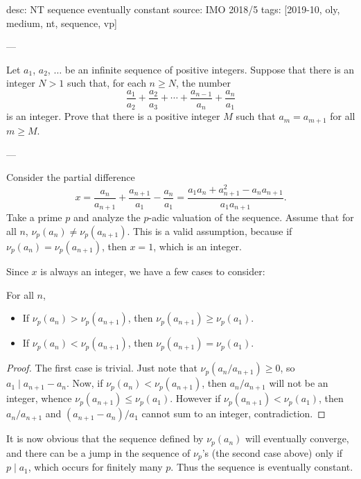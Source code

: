desc: NT sequence eventually constant
source: IMO 2018/5
tags: [2019-10, oly, medium, nt, sequence, vp]

---

Let $a_1$, $a_2$, $\ldots$ be an infinite sequence of positive integers. Suppose that there is an integer $N>1$ such that, for each $n\ge N$, the number \[\frac{a_1}{a_2}+\frac{a_2}{a_3}+\cdots+\frac{a_{n-1}}{a_n}+\frac{a_n}{a_1}\]
is an integer. Prove that there is a positive integer $M$ such that $a_m=a_{m+1}$ for all $m\ge M$.

---

Consider the partial difference \[x=\frac{a_n}{a_{n+1}}+\frac{a_{n+1}}{a_1}-\frac{a_n}{a_1}=\frac{a_1a_n+a_{n+1}^2-a_na_{n+1}}{a_1a_{n+1}}.\]
Take a prime $p$ and analyze the $p$-adic valuation of the sequence. Assume that for all $n$, $\nu_p(a_n)\ne\nu_p(a_{n+1})$. This is a valid assumption, because if $\nu_p(a_n)=\nu_p(a_{n+1})$, then $x=1$, which is an integer.

Since $x$ is always an integer, we have a few cases to consider:
\begin{claim*}
    For all $n$,
    \begin{itemize}
        \item If $\nu_p(a_n)>\nu_p(a_{n+1})$, then $\nu_p(a_{n+1})\ge\nu_p(a_1)$.
        \item If $\nu_p(a_n)<\nu_p(a_{n+1})$, then $\nu_p(a_{n+1})=\nu_p(a_1)$.
    \end{itemize}
\end{claim*}
\begin{proof}
    The first case is trivial. Just note that $\nu_p(a_n/a_{n+1})\ge0$, so $a_1\mid a_{n+1}-a_n$. Now, if $\nu_p(a_n)<\nu_p(a_{n+1})$, then $a_n/a_{n+1}$ will not be an integer, whence $\nu_p(a_{n+1})\le\nu_p(a_1)$. However if $\nu_p(a_{n+1})<\nu_p(a_1)$, then $a_n/a_{n+1}$ and $(a_{n+1}-a_n)/a_1$ cannot sum to an integer, contradiction.
\end{proof}

It is now obvious that the sequence defined by $\nu_p(a_n)$ will eventually converge, and there can be a jump in the sequence of $\nu_p$'s (the second case above) only if $p\mid a_1$, which occurs for finitely many $p$. Thus the sequence is eventually constant.
